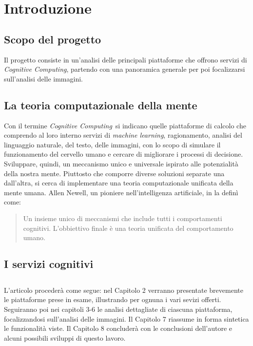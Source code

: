 
\section{Introduzione}

\subsection{Scopo del progetto}
Il progetto consiste in un'analisi delle principali piattaforme che offrono servizi di \textit{Cognitive Computing},
partendo con una panoramica generale per poi focalizzarsi sull'analisi delle immagini.

\subsection{La teoria computazionale della mente}
Con il termine \textit{Cognitive Computing} si indicano quelle piattaforme di calcolo che comprendo al loro interno servizi
di \textit{machine learning}, ragionamento, analisi del linguaggio naturale, del testo, delle immagini, con lo scopo di simulare
il funzionamento del cervello umano e cercare di migliorare i processi di decisione.
Sviluppare, quindi, un meccanismo unico e universale ispirato alle potenzialità della nostra mente.
Piuttosto che comporre diverse soluzioni separate una dall'altra, si cerca di implementare una teoria computazionale unificata della mente umana.
Allen Newell, un pioniere nell'intelligenza artificiale, in \cite{newell92} la definì come:
\begin{quote}
Un insieme unico di meccanismi che include tutti i comportamenti cognitivi. L'obbiettivo finale è una teoria unificata del comportamento umano.
\end{quote}

\subsection{I servizi cognitivi}

\subsection*{}
L'articolo procederà come segue: nel Capitolo 2 verranno presentate brevemente le piattaforme prese in esame, illustrando per ognuna i vari sevizi offerti.
Seguiranno poi nei capitoli 3-6 le analisi dettagliate di ciascuna piattaforma, focalizzandosi sull'analisi delle immagini.
Il Capitolo 7 riassume in forma sintetica le funzionalità viste.
Il Capitolo 8 concluderà con le conclusioni dell'autore e alcuni possibili sviluppi di questo lavoro.
